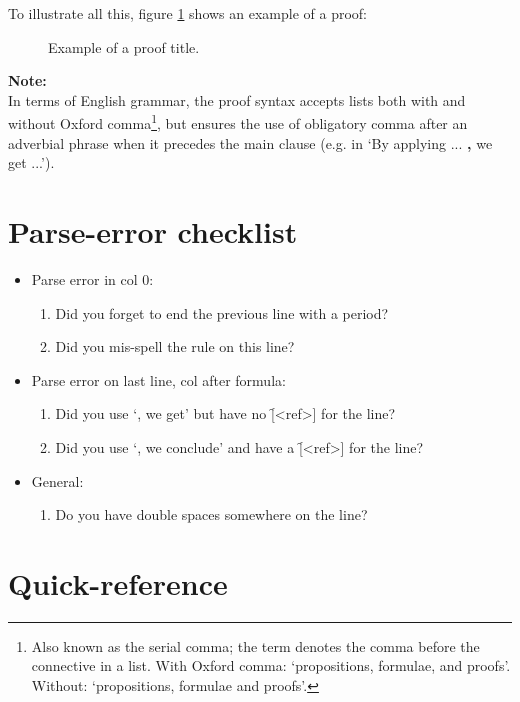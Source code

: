 \documentclass[manual.tex]{subfiles}
\begin{document}
To illustrate all this, figure \ref{ex:proof} shows an example of a proof:

\begin{figure}[!hb]

\caption{Example of a proof title.}
\label{ex:proof}
\end{figure}

{\bf Note:}\\
 In terms of English grammar, the proof syntax accepts lists both with and
 without Oxford comma\footnote{Also known as the serial comma; the term
 denotes the comma before the connective in a list. 
 With Oxford comma: `propositions, formulae, and proofs'. 
 Without: `propositions, formulae and proofs'.},
 but ensures the use of obligatory comma after an adverbial phrase
 when it precedes the main clause (e.g. in `By applying ... {\bf ,} we get
 ...'). 

\clearpage
\section{Parse-error checklist}
\begin{itemize}
\item Parse error in col 0:
    \begin{enumerate}[{\bf ?}]
      \item Did you forget to end the previous line with a period?
      \item Did you mis-spell the rule on this line?
    \end{enumerate}
\item Parse error on last line, col after formula:
    \begin{enumerate}[{\bf ?}]
      \item Did you use `, we get' but have no \f{[<ref>]} for the line?
      \item Did you use `, we conclude' and have a \f{[<ref>]} for the line?
    \end{enumerate}
\item General:
    \begin{enumerate}[{\bf ?}]
      \item Do you have double spaces somewhere on the line?
    \end{enumerate}
\end{itemize}

\clearpage
\section{Quick-reference}\label{qr}
\end{document}
